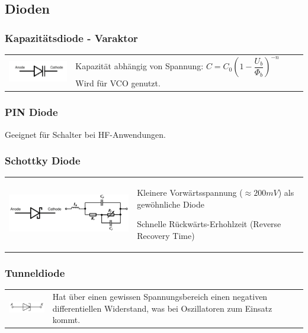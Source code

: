 	


\subsection{Dioden }
\subsubsection{Kapazitätsdiode - Varaktor }
\begin{tabular}{ll} 
	\parbox{5cm}{
		\includegraphics[width=4cm]{./bilder/components_diode_varactor.png}	
	 } 
	& \parbox{13cm}{ 	 
		Kapazität abhängig von Spannung: $ C=C_0\left (1-\dfrac{U_b}{\Phi_b}
		\right )^{-n} \quad$
		Wird für VCO genutzt.
		}
\end{tabular}

\subsubsection{PIN Diode }
Geeignet für Schalter bei HF-Anwendungen. 

\subsubsection{Schottky Diode }
\begin{tabular}{ll} 
	\parbox{9cm}{
		\includegraphics[width=9cm]{./bilder/components_diode_schottky.png}	
	 } 
	& \parbox{9.5cm}{ 	 
		\begin{liste}
        	\item Kleinere Vorwärtsspannung ($ \approx 200 mV$) als gewöhnliche
        	Diode 
        	\item Schnelle Rückwärts-Erhohlzeit (Reverse Recovery Time)         
        \end{liste}
		}
\end{tabular}

\subsubsection{Tunneldiode }
\begin{tabular}{ll}
    \parbox{4cm}{
        \includegraphics[width=3.5cm]{./bilder/components_diode_tunnel.png}
        }
    & \parbox{14cm}{
		Hat über einen gewissen Spannungsbereich einen negativen differentiellen
		Widerstand, was bei Oszillatoren zum Einsatz kommt.
        }
\end{tabular}


